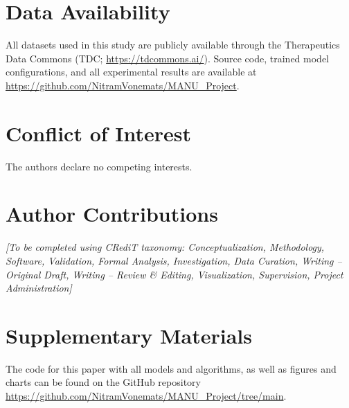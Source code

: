 \documentclass[12pt]{article}
\begin{document}
\section*{Data Availability}
All datasets used in this study are publicly available through the Therapeutics Data Commons (TDC; \url{https://tdcommons.ai/}). Source code, trained model configurations, and all experimental results are available at \url{https://github.com/NitramVonemats/MANU_Project}.

\section*{Conflict of Interest}
The authors declare no competing interests.

\section*{Author Contributions}
\textit{[To be completed using CRediT taxonomy: Conceptualization, Methodology, Software, Validation, Formal Analysis, Investigation, Data Curation, Writing -- Original Draft, Writing -- Review \& Editing, Visualization, Supervision, Project Administration]}

\section*{Supplementary Materials}
The code for this paper with all models and algorithms, as well as figures and charts can be found on the GitHub repository \url{https://github.com/NitramVonemats/MANU_Project/tree/main}.



\end{document}
